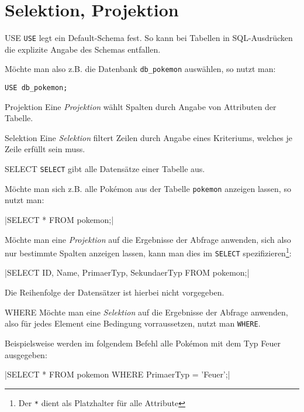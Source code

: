 \section{Selektion, Projektion}

\begin{sql}{USE}
    \texttt{USE} legt ein Default-Schema fest.
    So kann bei Tabellen in SQL-Ausdrücken die explizite Angabe des Schemas entfallen.

    Möchte man also z.B. die Datenbank \texttt{db\_pokemon} auswählen, so nutzt man:

    \begin{verbatim}
USE db_pokemon;
    \end{verbatim}
\end{sql}

\begin{defi}{Projektion}
    Eine \emph{Projektion} wählt Spalten durch Angabe von Attributen der Tabelle.
\end{defi}

\begin{defi}{Selektion}
    Eine \emph{Selektion} filtert Zeilen durch Angabe eines Kriteriums, welches je Zeile erfüllt sein muss.
\end{defi}

\begin{sql}{SELECT}
    \texttt{SELECT} gibt alle Datensätze einer Tabelle aus.

    Möchte man sich z.B. alle Pokémon aus der Tabelle \texttt{pokemon} anzeigen lassen, so nutzt man:

    |SELECT * FROM pokemon;|

    

    Möchte man eine \emph{Projektion} auf die Ergebnisse der Abfrage anwenden, sich also nur bestimmte Spalten anzeigen lassen, kann man dies im \texttt{SELECT} spezifizieren\footnote{Der \texttt{*} dient als Platzhalter für alle Attribute}:

    |SELECT ID, Name, PrimaerTyp, SekundaerTyp FROM pokemon;|

    

    Die Reihenfolge der Datensätzer ist hierbei nicht vorgegeben.
\end{sql}

\begin{sql}{WHERE}
    Möchte man eine \emph{Selektion} auf die Ergebnisse der Abfrage anwenden, also für jedes Element eine Bedingung vorraussetzen, nutzt man \texttt{WHERE}.

    Beispielsweise werden im folgendem Befehl alle Pokémon mit dem Typ Feuer ausgegeben:

    |SELECT * FROM pokemon WHERE PrimaerTyp = 'Feuer';|

    
\end{sql}


